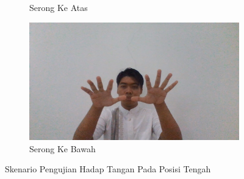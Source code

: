 \begin{enumerate}
\begin{figure}[H]
\begin{subfigure}{0.4\textwidth}
      \caption{Serong Ke Atas}
      \label{fig:serongatas}
    \end{subfigure}
    \begin{subfigure}{0.4\textwidth}
      \centering
      \includegraphics[width=\linewidth]{../Gambar/Tengahserongbawah.jpg}
      \caption{Serong Ke Bawah}
      \label{fig:serongbawah}
    \end{subfigure}
    \centering
    \caption{Skenario Pengujian Hadap Tangan Pada Posisi Tengah}
    \label{fig:posisitengah}
  \end{figure}


\end{enumerate}
